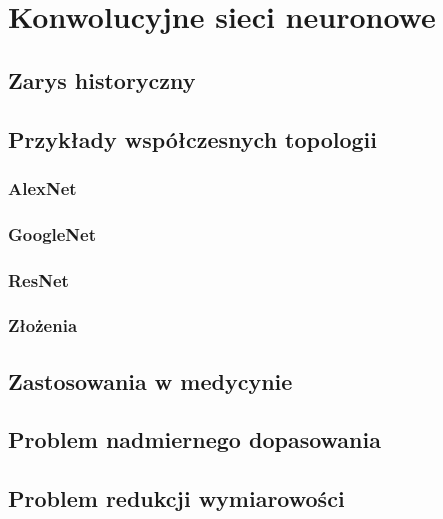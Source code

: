 \chapter{Konwolucyjne sieci neuronowe}
\section{Zarys historyczny}
\section{Przykłady współczesnych topologii}
\subsection{AlexNet}
\subsection{GoogleNet}
\subsection{ResNet}
\subsection{Złożenia}
\section{Zastosowania w medycynie}
\section{Problem nadmiernego dopasowania}
\section{Problem redukcji wymiarowości}